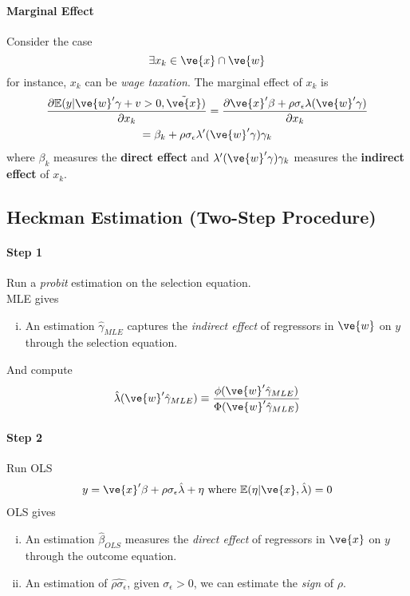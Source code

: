 \documentclass[11pt]{article}
\begin{document}
			\paragraph{Marginal Effect} Consider the case 
			\begin{equation}
				\exists x_k \in \ve{x} \cap \ve{w}
			\end{equation}
			for instance, $x_k$ can be \emph{wage taxation}. The marginal effect of $x_k$ is
			\begin{gather}
				\pd{\expect{y|\ve{w}'\gamma + v > 0, \tilde{\ve{x}}}}{x_k} = \pd{\ve{x}' \beta + \rho \sigma_\epsilon \lambda(\ve{w}'\gamma)}{x_k} \\
				= \beta_k + \rho \sigma_\epsilon \lambda'(\ve{w}'\gamma) \gamma_k \\
			\end{gather}
			where $\beta_k$ measures the \textbf{direct effect} and $\lambda'(\ve{w}'\gamma) \gamma_k$ measures the \textbf{indirect effect} of $x_k$.
		\subsection{Heckman Estimation (Two-Step Procedure)}
			\paragraph{Step 1} Run a \emph{probit} estimation on the selection equation.\\
			MLE gives
			\begin{enumerate}[(i)]
				\item An estimation $\hat{\gamma}_{MLE}$ captures the \emph{indirect effect} of regressors in $\ve{w}$ on $y$ through the selection equation.
			\end{enumerate}
			And compute
			\begin{gather}
				\hat{\lambda}(\ve{w}'\hat{\gamma}_{MLE}) \equiv \frac{\phi(\ve{w}'\hat{\gamma}_{MLE})}{\Phi(\ve{w}'\hat{\gamma}_{MLE})}
			\end{gather}
			\paragraph{Step 2} Run OLS
			\begin{gather}
				y = \ve{x}' \beta + \rho \sigma_\epsilon \hat{\lambda} + \eta \tx{ where } \expect{\eta | \ve{x}, \hat{\lambda}} = 0
			\end{gather}
			OLS gives
			\begin{enumerate}[(i)]
				\item An estimation $\hat{\beta}_{OLS}$ measures the \emph{direct effect} of regressors in $\ve{x}$ on $y$ through the outcome equation.
				\item An estimation of $\widehat{\rho \sigma_\epsilon}$, given $\sigma_\epsilon > 0$, we can estimate the \emph{sign} of $\rho$.
			\end{enumerate}
			
\end{document}
